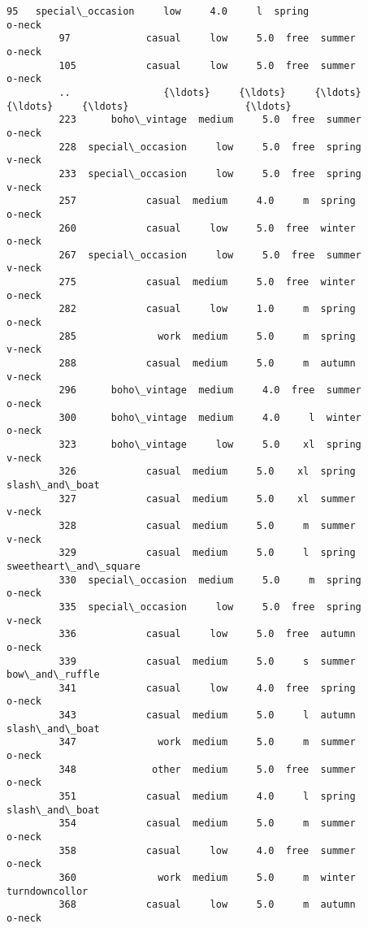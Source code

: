 \documentclass[11pt]{article}
\begin{document}
\begin{Verbatim}[commandchars=\\\{\}]
         95   special\_occasion     low     4.0     l  spring                 o-neck   
         97             casual     low     5.0  free  summer                 o-neck   
         105            casual     low     5.0  free  summer                 o-neck   
         ..                {\ldots}     {\ldots}     {\ldots}   {\ldots}     {\ldots}                    {\ldots}   
         223      boho\_vintage  medium     5.0  free  summer                 o-neck   
         228  special\_occasion     low     5.0  free  spring                 v-neck   
         233  special\_occasion     low     5.0  free  spring                 v-neck   
         257            casual  medium     4.0     m  spring                 o-neck   
         260            casual     low     5.0  free  winter                 o-neck   
         267  special\_occasion     low     5.0  free  summer                 v-neck   
         275            casual  medium     5.0  free  winter                 o-neck   
         282            casual     low     1.0     m  spring                 o-neck   
         285              work  medium     5.0     m  spring                 v-neck   
         288            casual  medium     5.0     m  autumn                 v-neck   
         296      boho\_vintage  medium     4.0  free  summer                 o-neck   
         300      boho\_vintage  medium     4.0     l  winter                 o-neck   
         323      boho\_vintage     low     5.0    xl  spring                 v-neck   
         326            casual  medium     5.0    xl  spring         slash\_and\_boat   
         327            casual  medium     5.0    xl  summer                 v-neck   
         328            casual  medium     5.0     m  summer                 v-neck   
         329            casual  medium     5.0     l  spring  sweetheart\_and\_square   
         330  special\_occasion  medium     5.0     m  spring                 o-neck   
         335  special\_occasion     low     5.0  free  spring                 v-neck   
         336            casual     low     5.0  free  autumn                 o-neck   
         339            casual  medium     5.0     s  summer         bow\_and\_ruffle   
         341            casual     low     4.0  free  spring                 o-neck   
         343            casual  medium     5.0     l  autumn         slash\_and\_boat   
         347              work  medium     5.0     m  summer                 o-neck   
         348             other  medium     5.0  free  summer                 o-neck   
         351            casual  medium     4.0     l  spring         slash\_and\_boat   
         354            casual  medium     5.0     m  summer                 o-neck   
         358            casual     low     4.0  free  summer                 o-neck   
         360              work  medium     5.0     m  winter         turndowncollor   
         368            casual     low     5.0     m  autumn                 o-neck   
         

\end{Verbatim}
\end{document}
